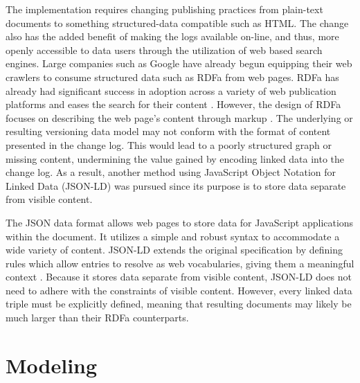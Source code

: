 The implementation requires changing publishing practices from plain-text documents to something structured-data compatible such as HTML.
The change also has the added benefit of making the logs available on-line, and thus, more openly accessible to data users through the utilization of web based search engines.
Large companies such as Google have already begun equipping their web crawlers to consume structured data such as RDFa from web pages.
RDFa has already had significant success in adoption across a variety of web publication platforms and eases the search for their content \cite{Bizer2013}.
However, the design of RDFa focuses on describing the web page's content through markup \cite{Herman2015}.
The underlying or resulting versioning data model may not conform with the format of content presented in the change log.
This would lead to a poorly structured graph or missing content, undermining the value gained by encoding linked data into the change log.
As a result, another method using JavaScript Object Notation for Linked Data (JSON-LD) was pursued since its purpose is to store data separate from visible content.

The JSON data format allows web pages to store data for JavaScript applications within the document.
It utilizes a simple and robust syntax to accommodate a wide variety of content.
JSON-LD extends the original specification by defining rules which allow entries to resolve as web vocabularies, giving them a meaningful context \cite{JSONLD}.
Because it stores data separate from visible content, JSON-LD does not need to adhere with the constraints of visible content.
However, every linked data triple must be explicitly defined, meaning that resulting documents may likely be much larger than their RDFa counterparts.

\section{Modeling} \label{sec:models}

